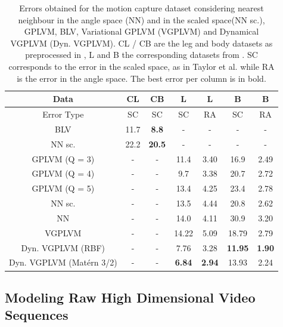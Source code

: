 \documentclass [10pt , a4paper]{article}
\begin{document}
\begin{table}[h]
\caption{
\small{
Errors obtained for the motion capture dataset considering nearest neighbour in the angle space (NN) and in the scaled space(NN sc.), GPLVM, BLV, Variational GPLVM (VGPLVM) and Dynamical VGPLVM (Dyn. VGPLVM). CL / CB are the leg and body datasets as preprocessed in \cite{Taylor}, L and B the corresponding datasets from \cite{gplvmLarger}. SC corresponds to the error in the scaled space, as in Taylor et al. while RA is the error in the angle space. The best error per column is in bold. }}
\label{motionCaptureTable}
\begin{center}
\begin{tabular}{c||c|c|c|c|c|c}
Data & CL & CB & L & L & B & B \\  \hline
Error Type & SC & SC & SC & RA & SC & RA \\
\hline \hline
BLV 			       & 11.7 & \textbf{8.8} & - & - & - & - \\  \hline
NN sc.   		       & 22.2 & \textbf{20.5} & - & - & - & - \\ \hline
GPLVM (Q = 3)	       & - & - & 11.4 & 3.40 & 16.9 & 2.49 \\ \hline
GPLVM (Q = 4)	       & - & - & 9.7  & 3.38 & 20.7 & 2.72 \\ \hline
GPLVM (Q = 5)	       & - & - & 13.4 & 4.25 & 23.4 & 2.78 \\ \hline
NN sc.  		       & - & - & 13.5 & 4.44 & 20.8 & 2.62 \\ \hline
NN 		 	       & - & - & 14.0 & 4.11 & 30.9 & 3.20 \\ \hline
VGPLVM                         & - & - & 14.22& 5.09 & 18.79& 2.79 \\ \hline
Dyn. VGPLVM (RBF)              & - & - & 7.76 & 3.28 & \textbf{11.95} & \textbf{1.90} \\ \hline
Dyn. VGPLVM (Mat\'ern 3/2)     & - & - & \textbf{6.84} & \textbf{2.94} & 13.93 & 2.24 \\
\end{tabular}
\end{center}
\end{table}



\subsection{Modeling Raw High Dimensional Video Sequences}
\end{document}
